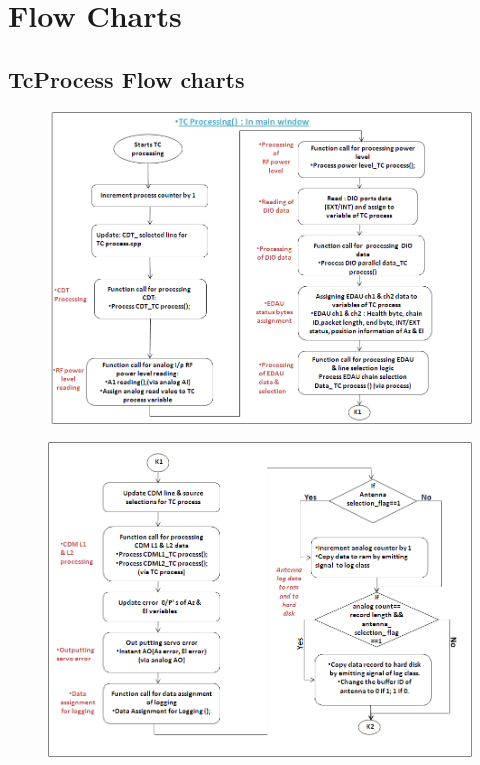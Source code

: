 \chapter{Flow Charts}
\label{Chapter8}
\section{TcProcess Flow charts}

\begin{figure}[H]
	\centering
	\includegraphics[width=\linewidth]{./FlowCharts/PngFlowCharts/TCP1.png}
\end{figure}

\begin{figure}[H]
	\centering
	\includegraphics[width=\linewidth]{./FlowCharts/PngFlowCharts/TCP2.png}
\end{figure}


